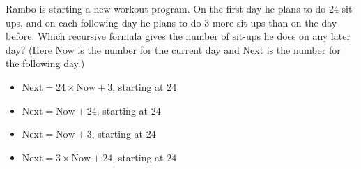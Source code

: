 Rambo is starting a new workout program. On the first day he plans to do $24$ sit-ups, and on each following day he plans to do $3$ more sit-ups than on the day before. Which recursive formula gives the number of sit-ups he does on any later day? (Here Now is the number for the current day and Next is the number for the following day.)
\begin{itemize}
\item[\textbf{(A)}] $\text{Next}=24\times\text{Now}+3$, starting at $24$
\item[\textbf{(B)}] $\text{Next}=\text{Now}+24$, starting at $24$
\item[\textbf{(C)}] $\text{Next}=\text{Now}+3$, starting at $24$
\item[\textbf{(D)}] $\text{Next}=3\times\text{Now}+24$, starting at $24$
\end{itemize}
